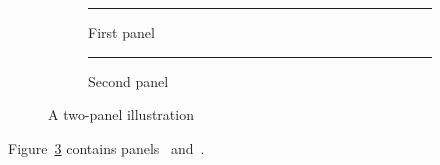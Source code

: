 \documentclass[11pt]{article}
\begin{document}
\begin{figure}[htbp]\centering
\begin{subfigure}{.45\linewidth}\centering\rule{\linewidth}{25mm}\caption{First panel}\label{fig:a}\end{subfigure}\hfill
\begin{subfigure}{.45\linewidth}\centering\rule{\linewidth}{25mm}\caption{Second panel}\label{fig:b}\end{subfigure}
\caption{A two-panel illustration}\label{fig:both}\end{figure}
Figure~\ref{fig:both} contains panels~ and~.
\end{document}

